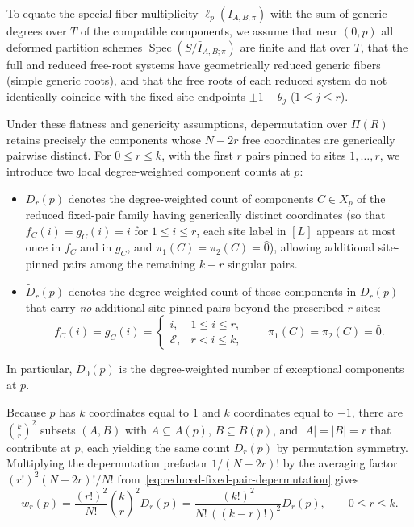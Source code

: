 \documentclass[11pt]{article}
\theoremstyle{definition}
\begin{document}
To equate the special-fiber multiplicity $\ell_p(I_{A,B;\pi})$ with the sum of generic degrees over $T$ of the compatible components, we assume that near $(0,p)$ all deformed partition
schemes $\operatorname{Spec}(S/\bar{I}_{A,B;\pi})$ are finite and flat over $T$, that the full and reduced
free-root systems have geometrically reduced generic fibers (simple generic roots), and that the free
roots of each reduced system do not identically coincide with the fixed site endpoints $\pm 1-\theta_j$ ($1\le j\le r$).

Under these flatness and genericity assumptions, depermutation over $\Pi(R)$ retains precisely the components whose $N-2r$ free coordinates are generically pairwise distinct. For $0\le r\le k$, with the first $r$ pairs pinned to sites $1,\ldots,r$, we introduce two local degree-weighted component counts at $p$:
\begin{itemize}
 \item $D_r(p)$ denotes the degree-weighted count of components $C\in\bar{X}_p$ of the
 reduced fixed-pair family having generically distinct coordinates (so that $f_C(i)=g_C(i)=i$ for
 $1\le i\le r$, each site label in $[L]$ appears at most once in $f_C$ and in $g_C$, and
 $\pi_1(C)=\pi_2(C)=\hat{0}$), allowing additional site-pinned pairs among the remaining $k-r$ singular pairs.
 \item $\tilde{D}_r(p)$ denotes the degree-weighted count of those components in
 $D_r(p)$ that carry \emph{no} additional site-pinned pairs beyond the prescribed $r$ sites:
 \[
 f_C(i)=g_C(i)=
 \begin{cases}
 i, & 1\le i\le r,\\
 \mathcal{E}, & r<i\le k,
 \end{cases}
 \qquad \pi_1(C)=\pi_2(C)=\hat{0}.
 \]
\end{itemize}
In particular, $\tilde{D}_0(p)$ is the degree-weighted number of exceptional components at $p$.

Because $p$ has $k$ coordinates equal to $1$ and $k$ coordinates equal to $-1$, there are $\binom{k}{r}^2$ subsets $(A,B)$ with $A\subseteq A(p)$, $B\subseteq B(p)$, and $|A|=|B|=r$ that contribute at $p$, each yielding the same count $D_r(p)$ by permutation symmetry. Multiplying the depermutation prefactor $1/(N-2r)!$ by the averaging factor $(r!)^2(N-2r)!/N!$ from~\eqref{eq:reduced-fixed-pair-depermutation} gives
\begin{equation}\label{eq:fixed-pair-component-weight}
 \boxed{w_r(p)
 =\frac{(r!)^2}{N!}\binom{k}{r}^2 D_r(p)
 =\frac{(k!)^2}{N!\,((k-r)!)^2}D_r(p),\qquad 0\le r\le k.}
\end{equation}
\end{document}
